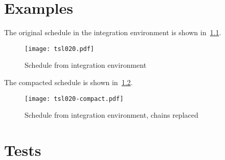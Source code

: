 \documentclass[12pt,a4paper]{report}
\begin{document}
\chapter{Examples}
The original schedule in the integration environment is shown in~\ref{fig:tsl020}.
    \begin{figure}
        \centering
        \texttt{[image: tsl020.pdf]}
        \caption{Schedule from integration environment}
        \label{fig:tsl020}
    \end{figure}
The compacted schedule is shown in~\ref{fig:tsl020-compact}.
    \begin{figure}
        \centering
        \texttt{[image: tsl020-compact.pdf]}
        \caption{Schedule from integration environment, chains replaced}
        \label{fig:tsl020-compact}
    \end{figure}


\chapter{Tests}
\end{document}
